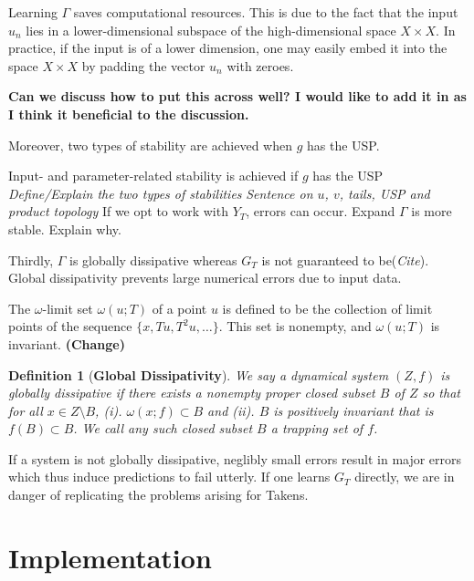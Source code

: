 \documentclass[a4paper,12pt,twoside]{book}
\newtheorem{Definition}{Definition}[]
\begin{document}
Learning $\Gamma$ saves computational resources. This is due to the fact that the input $u_n$ lies in a lower-dimensional subspace of the high-dimensional space $X\times{X}$. In practice, if the input is of a  lower dimension, one may easily embed it into the space $X\times{X}$ by padding the vector $u_n$ with zeroes.

\textbf{Can we discuss how to put this across well? I would like to add it in as I think it beneficial to the discussion.}

Moreover, two types of stability are achieved when $g$ has the USP. 


Input- and parameter-related stability is achieved if $g$ has the USP
\newline \emph{Define/Explain the two types of stabilities}
\newline \emph{Sentence on $u$, $v$, tails, USP and product topology}
\newline If we opt to work with $Y_T$, errors can occur. Expand
\newline $\Gamma$ is more stable. Explain why.

Thirdly, $\Gamma$ is globally dissipative whereas $G_T$ is not guaranteed to be(\emph{Cite}).  Global dissipativity prevents large numerical errors due to input data.

The $\omega$-limit set $\omega(u;T)$ of a point $u$ is defined to be the collection of limit points of the sequence $\{x,Tu,T^2u,\ldots\}$. This set is nonempty, and $\omega(u;T)$ is invariant. \textbf{(Change)}

\begin{Definition}
  [\bf Global Dissipativity]\label{Dfn_GlobalDiss}
	We say a dynamical system $(Z,f)$ is globally dissipative if there exists a nonempty proper closed subset $B$ of $Z$  so that for all $x\in Z\setminus B$, (i). $\omega(x;f) \subset B$  and (ii).  $B$ is positively invariant that is $f(B) \subset B$. We call any such closed subset $B$ a trapping set of $f$. 
\end{Definition}

If a system is not globally dissipative, neglibly small errors result in major errors which thus induce predictions to fail utterly. If one learns $G_T$ directly, we are in danger of replicating the problems arising for Takens. 






\chapter{Implementation} \label{sect5}
 
 



\vspace{-1cm}


\end{document}
